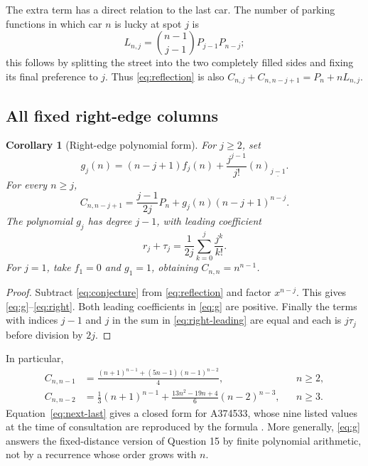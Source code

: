 \documentclass[11pt,letterpaper]{article}
\numberwithin{equation}{section}
\newtheorem{corollary}[theorem]{Corollary}
\theoremstyle{definition}
\newcommand{\fall}[2]{(#1)_{\underline{#2}}}
\begin{document}
The extra term has a direct relation to the last car. The number of parking
functions in which car $n$ is lucky at spot $j$ is
\[
 L_{n,j}=\binom{n-1}{j-1}P_{j-1}P_{n-j};
\]
this follows by splitting the street into the two completely filled sides
and fixing its final preference to $j$. Thus \eqref{eq:reflection} is also
$C_{n,j}+C_{n,n-j+1}=P_n+nL_{n,j}$.

\subsection{All fixed right-edge columns}
\begin{corollary}[Right-edge polynomial form]\label{cor:right}
For $j\ge2$, set
\begin{equation}\label{eq:g}
 g_j(n)=(n-j+1)f_j(n)+\frac{j^{j-1}}{j!}\fall n{j-1}.
\end{equation}
For every $n\ge j$,
\begin{equation}\label{eq:right}
 C_{n,n-j+1}=\frac{j-1}{2j}P_n
                 +g_j(n)(n-j+1)^{n-j}.
\end{equation}
The polynomial $g_j$ has degree $j-1$, with leading coefficient
\begin{equation}\label{eq:right-leading}
 r_j+\tau_j=\frac1{2j}\sum_{k=0}^{j}\frac{j^k}{k!}.
\end{equation}
For $j=1$, take $f_1=0$ and $g_1=1$, obtaining $C_{n,n}=n^{n-1}$.
\end{corollary}
\begin{proof}
Subtract \eqref{eq:conjecture} from \eqref{eq:reflection} and factor
$x^{n-j}$. This gives \eqref{eq:g}--\eqref{eq:right}. Both leading
coefficients in \eqref{eq:g} are positive. Finally the terms with indices
$j-1$ and $j$ in the sum in \eqref{eq:right-leading} are equal and each
is $j\tau_j$ before division by $2j$.
\end{proof}

In particular,
\begin{align}
 C_{n,n-1}
 &=\frac{(n+1)^{n-1}+(5n-1)(n-1)^{n-2}}4,
 && n\ge2,\label{eq:next-last}\\
 C_{n,n-2}
 &=\frac13(n+1)^{n-1}
   +\frac{13n^2-19n+4}{6}(n-2)^{n-3},
 && n\ge3.\label{eq:third-last}
\end{align}
Equation~\eqref{eq:next-last} gives a closed form for A374533, whose nine
listed values at the time of consultation are reproduced by the formula
\cite{oeis-next}. More generally, \eqref{eq:g} answers the fixed-distance
version of Question 15 by finite polynomial arithmetic, not by a recurrence
whose order grows with $n$.
\end{document}

